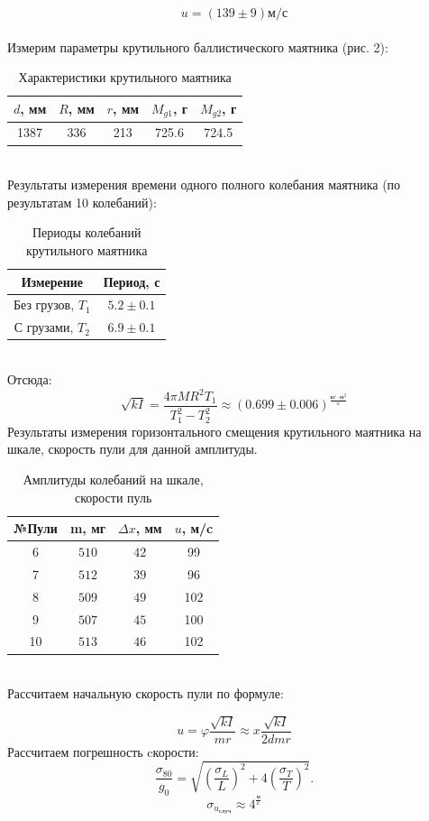 \documentclass[a4paper]{article}
\begin{document}
\[u = (139 \pm 9) \text{м/с}\]
\\
Измерим параметры крутильного баллистического маятника (рис. 2):
\begin{table}[!h]
\centering
\caption{Характеристики крутильного маятника}
\begin{tabular}{|c|c|c|c|c|}        \hline
    $d$, мм & $R$, мм & $r$, мм & $M_{g1}$, г& $M_{g2}$, г\\ \hline
    1387 & 336 & 213 & 725.6 & 724.5 \\ \hline
\end{tabular}
\end{table} \\
Результаты измерения времени одного полного колебания маятника (по результатам 10 колебаний):
\begin{table}[!h]
\centering
\caption{ Периоды колебаний крутильного маятника}
\begin{tabular}{|c|c|}        \hline
    Измерение & Период, с \\  \hline
    Без грузов, $T_1$ & $5.2\pm 0.1$  \\ \hline
    С грузами, $T_2$ & $6.9\pm 0.1$ \\ \hline
\end{tabular}
\end{table} \\
Отсюда:
\[\sqrt{kI} = \frac{4\pi MR^2 T_1}{T_1^2 - T_2^2} \approx (0.699 \pm 0.006)^{\frac{\text{кг} \cdot \text{м}^2}{\text{с}}}\]
Результаты измерения горизонтального смещения крутильного маятника на шкале, скорость пули для данной амплитуды.
\begin{table}[!h]
\centering
\caption{Амплитуды колебаний на шкале, скорости пуль}
\begin{tabular}{|c|c|c|c|}        \hline
    №Пули &  m, мг & $\Delta x$, мм & $u$, м/c \\  \hline
    6 & $510$ & $42$ & 99\\ \hline
    7 & $512$ & $39$ & 96\\ \hline
    8 & $509$ & $49$ & 102\\ \hline
    9 & $507$ & $45$ & 100\\ \hline
    10 & $513$ & $46$ & 102\\ \hline
\end{tabular}
\end{table} \\
Рассчитаем начальную скорость пули по формуле:

\[u = \varphi \frac{\sqrt{kI}}{mr} \approx x \frac{\sqrt{kI}}{2dmr}\]
Рассчитаем погрешность cкорости:
\[
\frac{\sigma_{80}}{g_0} = \sqrt{ \left( \frac{\sigma_L}{L} \right)^2 + 4 \left( \frac{\sigma_T}{T} \right)^2 }.
\]
\[\sigma_{u_{\text{случ}}} \approx 4^{\frac{\text{м}}{\text{с}}}\]
\end{document}
